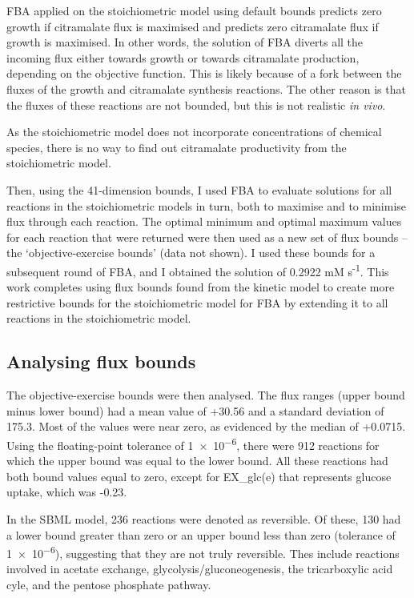 \documentclass[parskip=full, numbers=noenddot]{scrreprt}
\begin{document}
FBA applied on the stoichiometric model using default bounds predicts zero growth if citramalate flux is maximised and predicts zero citramalate flux if growth is maximised. In other words, the solution of FBA diverts all the incoming flux either towards growth or towards citramalate production, depending on the objective function.
This is likely because of a fork between the fluxes of the growth and citramalate synthesis reactions. The other reason is that the fluxes of these reactions are not bounded, but this is not realistic \emph{in vivo}.

As the stoichiometric model does not incorporate concentrations of chemical species, there is no way to find out citramalate productivity from the stoichiometric model.

Then, using the 41-dimension bounds, I used FBA to evaluate solutions for all reactions in the stoichiometric models in turn, both to maximise and to minimise flux through each reaction. The optimal minimum and optimal maximum values for each reaction that were returned were then used as a new set of flux bounds -- the `objective-exercise bounds' (data not shown). I used these bounds for a subsequent round of FBA, and I obtained the solution of 0.2922 mM s\textsuperscript{-1}. This work completes using flux bounds found from the kinetic model to create more restrictive bounds for the stoichiometric model for FBA by extending it to all reactions in the stoichiometric model.

\subsection{Analysing flux bounds}
\label{ssec:objectiveexercise}

The objective-exercise bounds were then analysed. The flux ranges (upper bound minus lower bound) had a mean value of +30.56 and a standard deviation of 175.3. Most of the values were near zero, as evidenced by the median of +0.0715. Using the floating-point tolerance of \num{1e-6}, there were 912 reactions for which the upper bound was equal to the lower bound. All these reactions had both bound values equal to zero, except for EX\_glc(e) that represents glucose uptake, which was -0.23.

In the SBML model, 236 reactions were denoted as reversible. Of these, 130 had a lower bound greater than zero or an upper bound less than zero (tolerance of \num{1e-6}), suggesting that they are not truly reversible. Thes include reactions involved in acetate exchange, glycolysis/gluconeogenesis, the tricarboxylic acid cyle, and the pentose phosphate pathway.
\end{document}
